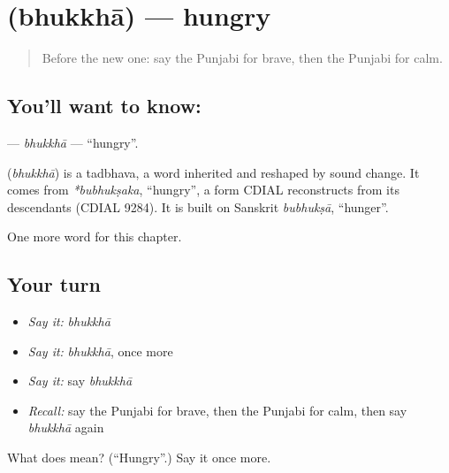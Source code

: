 \section[\texorpdfstring{\pa{ਭੁੱਖਾ} (bhukkhā)}{ਭੁੱਖਾ (bhukkhā)}]{ (bhukkhā) — hungry}

\label{lesson:PA-C145-bhukkha}



\begin{quote}
Before the new one: say the Punjabi for brave, then the Punjabi for calm.
\end{quote}

\subsection*{You'll want to know: }
\textbf{} — \emph{bhukkhā} — \textquotedblleft{}hungry\textquotedblright{}.

\begin{cousinweb}
\textbf{} (\emph{bhukkhā}) is a tadbhava, a word inherited and reshaped by sound change. It comes from \emph{*bubhukṣaka}, \textquotedblleft{}hungry\textquotedblright{}, a form CDIAL reconstructs from its descendants (CDIAL 9284). It is built on Sanskrit \emph{bubhukṣā}, \textquotedblleft{}hunger\textquotedblright{}.
\end{cousinweb}

\begin{grammarlens}[title={What you've built}]
One more word for this chapter.
\end{grammarlens}

\subsection*{Your turn}
\begin{itemize}
\raggedright
  \item \emph{Say it:} \emph{bhukkhā}
  \item \emph{Say it:} \emph{bhukkhā}, once more
  \item \emph{Say it:} say \emph{bhukkhā}
  \item \emph{Recall:} say the Punjabi for brave, then the Punjabi for calm, then say \emph{bhukkhā} again
\end{itemize}

\begin{tcolorbox}[breakable,colback=teal!4,colframe=teal!35!black,title={Before you move on}]
What does  mean? (\textquotedblleft{}Hungry\textquotedblright{}.) Say it once more.
\end{tcolorbox}
